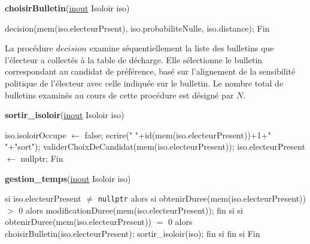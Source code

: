 \documentclass[12pt]{article} %
\begin{document}
	\begin{algorithm}
		\caption{\textbf{choisirBulletin}(\underline{inout} Isoloir iso)}
		\begin{algorithmic}[1]
			\Start
			\State decision(mem(iso.electeurPrsent), iso.probabiliteNulle, iso.distance); 
			\State Fin
		\end{algorithmic}
	\end{algorithm}
	
La procédure $decision$ examine séquentiellement la liste des bulletins que l'électeur a collectés à la table de décharge. Elle sélectionne le bulletin correspondant au candidat de préférence, basé sur l'alignement de la sensibilité politique de l'électeur avec celle indiquée sur le bulletin. Le nombre total de bulletins examinés au cours de cette procédure est désigné par \( N \).
	
\newpage

\begin{algorithm}
	\caption{\textbf{sortir\_isoloir}(\underline{inout} Isoloir iso)}
	\begin{algorithmic}[1]
		\Start
		\State iso.isoloirOccupe $\leftarrow$ false;
		\State ecrire(" "+id(mem(iso.electeurPresent))+1+" "+"sort"); \Comment{\textbf{Coût} : Constant $O(1)$}
		\State validerChoixDeCandidat(mem(iso.electeurPresent));
		\State iso.electeurPresent $\leftarrow$ nullptr;
		\State Fin
		
	\end{algorithmic}
\end{algorithm}
\begin{algorithm}
	\caption{\textbf{gestion\_temps}(\underline{inout} Isoloir iso)}
	\begin{algorithmic}[1]
		\Start
		\State si iso.electeurPresent $\neq$ \texttt{nullptr} alors
		\State \hspace{\algorithmicindent} si obtenirDuree(mem(iso.electeurPresent)) $>$ 0 alors
		\State \hspace{\algorithmicindent}\hspace{\algorithmicindent}  modificationDuree(mem(iso.electeurPresent));
		\State \hspace{\algorithmicindent} fin si \Comment{\textbf{Coût} : $\Omega(1)$ $\cap$ $O(N)$}
		\State \hspace{\algorithmicindent} si obtenirDuree(mem(iso.electeurPresent)) $=$ 0 alors
		\State \hspace{\algorithmicindent}\hspace{\algorithmicindent} choisirBulletin(iso.electeurPresent);
		\State \hspace{\algorithmicindent}\hspace{\algorithmicindent} sortir\_isoloir(iso);
		\State \hspace{\algorithmicindent} fin si
		\State fin si
		\State Fin
	\end{algorithmic}
\end{algorithm}
\end{document}
